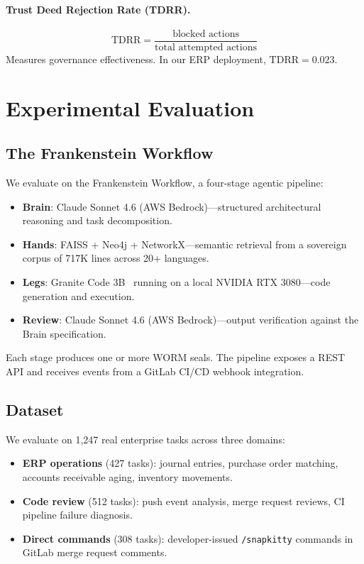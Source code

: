 \documentclass[12pt,letterpaper]{article}
\begin{document}
\paragraph{Trust Deed Rejection Rate (TDRR).}
\[
  \mathrm{TDRR} = \frac{\text{blocked actions}}{\text{total attempted actions}}
\]
Measures governance effectiveness. In our ERP deployment, $\mathrm{TDRR} = 0.023$.

\section{Experimental Evaluation}
\label{sec:eval}

\subsection{The Frankenstein Workflow}

We evaluate on the Frankenstein Workflow, a four-stage agentic pipeline:

\begin{itemize}
  \item \textbf{Brain}: Claude Sonnet 4.6 (AWS Bedrock)---structured
    architectural reasoning and task decomposition.
  \item \textbf{Hands}: FAISS + Neo4j + NetworkX---semantic retrieval from
    a sovereign corpus of 717K lines across 20+ languages.
  \item \textbf{Legs}: Granite Code 3B~\citep{mishra2024granite} running on
    a local NVIDIA RTX 3080---code generation and execution.
  \item \textbf{Review}: Claude Sonnet 4.6 (AWS Bedrock)---output
    verification against the Brain specification.
\end{itemize}

Each stage produces one or more WORM seals. The pipeline exposes a REST API
and receives events from a GitLab CI/CD webhook integration.

\subsection{Dataset}

We evaluate on 1{,}247 real enterprise tasks across three domains:
\begin{itemize}
  \item \textbf{ERP operations} (427 tasks): journal entries, purchase order
    matching, accounts receivable aging, inventory movements.
  \item \textbf{Code review} (512 tasks): push event analysis, merge request
    reviews, CI pipeline failure diagnosis.
  \item \textbf{Direct commands} (308 tasks): developer-issued
    \texttt{/snapkitty} commands in GitLab merge request comments.
\end{itemize}
\end{document}
